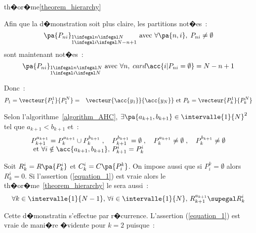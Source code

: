 \begin{xdemo}{th�or�me}{\ref{theorem_hierarchy}}

Afin que la d�monstration soit plus claire, les partitions not�es~:
    $$
    \pa{P_{ni}}_{  \begin{subarray}{l} 1 \infegal n \infegal N \\ 1 \infegal i \infegal N-n+1 \end{subarray}  }%
    \text{ avec } \forall \pa{n,i}, \; P_{ni} \neq \emptyset
    $$
sont maintenant not�es~:
    $$
    \pa{P_{ni}}_{\begin{subarray}{l} 1 \infegal n \infegal N \\ 1 \infegal i \infegal N \end{subarray}} %
    \text{ avec } \forall n, \; card \acc{ i | P_{ni} = \emptyset } = N-n+1
    $$

Donc~:
    \begin{eqnarray*}
    P_1 = \vecteur{P_1^1}{P_1^N}        &=&     \vecteur{\acc{y_1}}{\acc{y_N}} \text{ et }
    P_k                     =     \vecteur{P_k^1}{P_k^N}
    \end{eqnarray*}

Selon l'algorithme~\ref{algorithm_AHC}, $\exists \pa{a_{k+1},b_{k+1}} \in \intervalle{1}{N}^2$ tel que $a_{k+1}                 <         b_{k+1}$ et~:
        $$
    \begin{array}{l}
    P_{k+1}^{a_{k+1}}       =         P_{k}^{a_{k+1}} \cup P_{k}^{b_{k+1}} \; , \quad 
    P_{k+1}^{b_{k+1}}       =         \emptyset  \; , \quad  
    P_k^{a_{k+1}}           \neq      \emptyset  \; , \quad  
    P_k^{b_{k+1}}           \neq      \emptyset \\
    \text{ et } \forall i \notin \acc{a_{k+1},b_{k+1}}, \, P_{k+1}^{i} = P_k^i
    \end{array}
    $$

Soit $R_k^i = R \pa{P_k^i}$ et $C_k^i = C \pa{P^k_i}$. On impose aussi que si $P^k_i = \emptyset$ alors $R_k^i = 0$. Si l'assertion (\ref{equation_1}) est vraie alors le th�or�me~\ref{theorem_hierarchy} le sera aussi~:
    \begin{eqnarray}
    \forall k \in \intervalle{1}{N-1}, \, \forall i \in \intervalle{1}{N}, \, R_{k+1}^{a_{k+1}} \supegal R_{k}^i
    \label{equation_1}
    \end{eqnarray}

Cette d�monstratin s'effectue par r�currence. L'assertion (\ref{equation_1}) est vraie de mani�re �vidente pour $k=2$ puisque~:


\end{xdemo}
